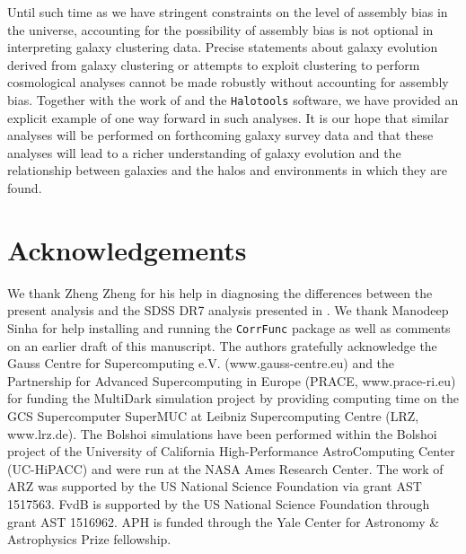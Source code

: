 \documentclass[usenatbib,usegraphicx,letterpaper]{mn2e}
\begin{document}
Until such time as we have stringent constraints on the level of assembly bias in the 
universe, accounting for the possibility of assembly bias is not optional in interpreting 
galaxy clustering data. Precise statements about galaxy evolution derived from 
galaxy clustering or attempts to exploit clustering to perform cosmological analyses 
cannot be made robustly without accounting for assembly bias. Together with 
the work of \citet{hearin_etal16} and the {\tt Halotools} software, we have provided 
an explicit example of one way forward in such analyses. It is our hope that similar analyses 
will be performed on forthcoming galaxy survey data and that these analyses will lead to a
richer understanding of galaxy evolution and the relationship between galaxies and the halos 
and environments in which they are found.

\section{Acknowledgements}
\label{section:acknowledgements}

We thank Zheng Zheng for his help in diagnosing the
differences between the present analysis and the SDSS DR7
analysis presented in \citet{zehavi_etal11}. We thank Manodeep 
Sinha for help installing and running the {\tt CorrFunc} package 
as well as comments on an earlier draft of this manuscript.
The authors gratefully acknowledge the Gauss Centre for Supercomputing
e.V. (www.gauss-centre.eu) and the Partnership for Advanced
Supercomputing in Europe (PRACE, www.prace-ri.eu) for funding the
MultiDark simulation project by providing computing time on the GCS
Supercomputer SuperMUC at Leibniz Supercomputing Centre (LRZ,
www.lrz.de). The Bolshoi simulations have been performed within the
Bolshoi project of the University of California High-Performance
AstroComputing Center (UC-HiPACC) and were run at the NASA Ames
Research Center. The work of ARZ was supported by the US National Science
Foundation via grant AST 1517563. FvdB is supported by the US National Science
Foundation through grant AST 1516962. APH is funded through the Yale Center 
for Astronomy \& Astrophysics Prize fellowship.




\end{document}
